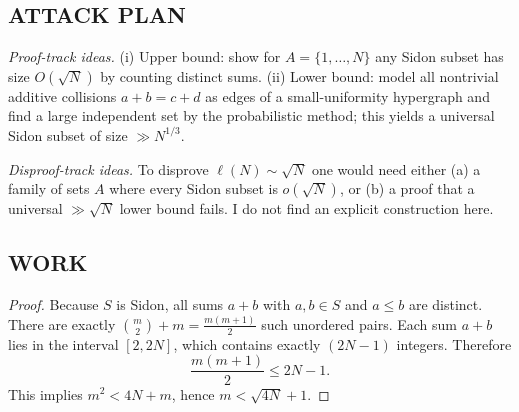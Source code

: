 \subsection*{ATTACK PLAN}
\emph{Proof-track ideas.}
(i) Upper bound: show for $A=\{1,\dots,N\}$ any Sidon subset has size $O(\sqrt N)$ by counting distinct sums.
(ii) Lower bound: model all nontrivial additive collisions $a+b=c+d$ as edges of a small-uniformity hypergraph and find a large independent set by the probabilistic method; this yields a universal Sidon subset of size $\gg N^{1/3}$.

\emph{Disproof-track ideas.}
To disprove $\ell(N)\sim \sqrt N$ one would need either (a) a family of sets $A$ where every Sidon subset is $o(\sqrt N)$, or (b) a proof that a universal $\gg\sqrt N$ lower bound fails. I do not find an explicit construction here.

\subsection*{WORK}
\begin{proof}
Because $S$ is Sidon, all sums $a+b$ with $a,b\in S$ and $a\le b$ are distinct. There are exactly $\binom m2+m=2$ such unordered pairs. Each sum $a+b$ lies in the interval $[2,2N]$, which contains exactly $(2N-1)$ integers. Therefore
\[
\frac{m(m+1)}2 \le 2N-1.
\]
This implies $m^2 < 4N + m$, hence $m < +1$.
\end{proof}

